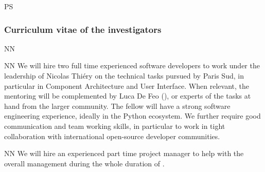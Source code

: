\begin{sitedescription}{PS}

\subsubsection*{Curriculum vitae of the investigators}


%




\begin{participant}[type=res,PM=48,salary=5500]{NN}
\end{participant}
\begin{participant}[type=res,PM=36,salary=5500]{NN}
  We will hire two full time experienced software developers to work
  under the leadership of Nicolas Thiéry on the technical tasks
  pursued by Paris Sud, in particular in
   Component Architecture and 
  User Interface. When relevant, the mentoring will be complemented by
  Luca De Feo (), or experts of the tasks at hand from the
  larger community.
  The fellow will have a strong software engineering experience,
  ideally in the Python ecosystem. We further require good
  communication and team working skills, in particular to work in
  tight collaboration with international open-source developer
  communities.
\end{participant}


\begin{participant}[type=res,PM=24,salary=3932]{NN}
  We will hire an experienced part time project manager to help with
  the overall management during the whole duration of \TheProject.
\end{participant}



\end{sitedescription}

